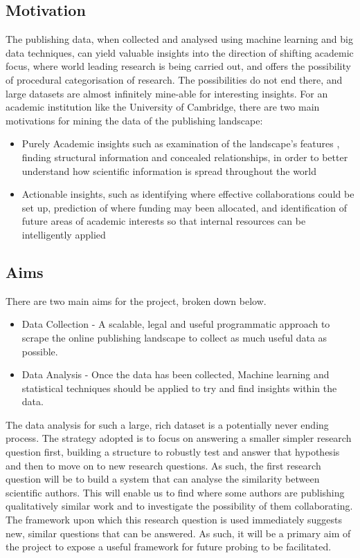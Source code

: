 \documentclass[11pt, oneside]{article}   	%
\begin{document}
\subsection{Motivation}
The publishing data, when collected and analysed using machine learning and big data techniques, can yield valuable insights into the direction of shifting academic focus, where world leading research is being carried out, and offers the possibility of procedural categorisation of research. The possibilities do not end there, and large datasets are almost infinitely mine-able for interesting insights. For an academic institution like the University of Cambridge, there are two main motivations for mining the data of the publishing landscape:
\begin{itemize}
\item{Purely Academic insights such as examination of the landscape's features , finding structural information and concealed relationships, in order to better understand how scientific information is spread throughout the world}
\item{Actionable insights, such as identifying where effective collaborations could be set up, prediction of where funding may been allocated, and identification of future areas of academic interests so that internal resources can be intelligently applied}
\end{itemize}
\subsection{Aims}
There are two main aims for the project, broken down below.
\begin{itemize}
\item{Data Collection - A scalable, legal and useful programmatic approach to scrape the online publishing landscape to collect as much useful data as possible.}
\item{Data Analysis - Once the data has been collected, Machine learning and statistical techniques should be applied to try and find insights within the data.}
\end{itemize}
The data analysis for such a large, rich dataset is a potentially never ending process. The strategy adopted is to focus on answering a smaller simpler research question first, building a structure to robustly test and answer that hypothesis and then to move on to new research questions.
As such, the first research question will be to build a system that can analyse the similarity between scientific authors. This will enable us to find where some authors are publishing qualitatively similar work and to investigate the possibility of them collaborating. 
The framework upon which this research question is used immediately suggests new, similar questions that can be answered. As such, it will be a primary aim of the project to expose a useful framework for future probing to be facilitated.
\end{document}
